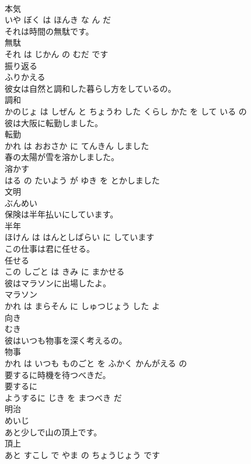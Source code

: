 \documentclass[8pt]{extreport}
\begin{document}
\begin{CJK}{UTF8}{min}
\\	本気 
\\	いや ぼく は ほんき な ん だ			
\\	それは時間の無駄です。	
\\	無駄 
\\	それ は じかん の むだ です			
\\	振り返る	
\\	ふりかえる			
\\	彼女は自然と調和した暮らし方をしているの。	
\\	調和 
\\	かのじょ は しぜん と ちょうわ した くらし かた を して いる の			
\\	彼は大阪に転勤しました。	
\\	転勤 
\\	かれ は おおさか に てんきん しました			
\\	春の太陽が雪を溶かしました。	
\\	溶かす 
\\	はる の たいよう が ゆき を とかしました			
\\	文明	
\\	ぶんめい			
\\	保険は半年払いにしています。	
\\	半年 
\\	ほけん は はんとしばらい に しています			
\\	この仕事は君に任せる。	
\\	任せる 
\\	この しごと は きみ に まかせる			
\\	彼はマラソンに出場したよ。	
\\	マラソン 
\\	かれ は まらそん に しゅつじょう した よ			
\\	向き	
\\	むき			
\\	彼はいつも物事を深く考えるの。	
\\	物事 
\\	かれ は いつも ものごと を ふかく かんがえる の			
\\	要するに時機を待つべきだ。	
\\	要するに 
\\	ようするに じき を まつべき だ			
\\	明治	
\\	めいじ			
\\	あと少しで山の頂上です。	
\\	頂上 
\\	あと すこし で やま の ちょうじょう です			

\end{CJK}
\end{document}
